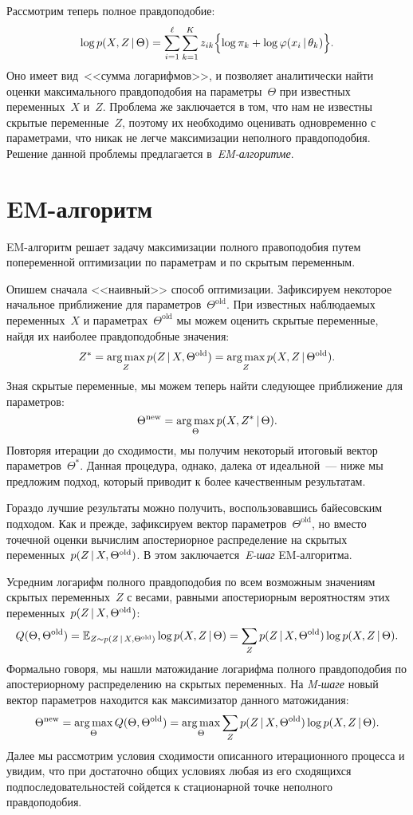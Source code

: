 \documentclass[12pt,fleqn]{article}
\begin{document}
Рассмотрим теперь полное правдоподобие:
\[
    \log p(X, Z \mspace{3mu}{|}\mspace{3mu} \Theta)
    =
    \sum_{i = 1}^{\ell}
    \sum_{k = 1}^{K}
        z_{ik}
        \Bigl\{
            \log \pi_k
            +
            \log \varphi(x_i \mspace{3mu}{|}\mspace{3mu} \theta_k)
        \Bigr\}.
\]
Оно имеет вид~<<сумма логарифмов>>,
и позволяет аналитически найти оценки максимального правдоподобия
на параметры~$\Theta$ при известных переменных~$X$ и~$Z$.
Проблема же заключается в том, что нам не известны скрытые переменные~$Z$,
поэтому их необходимо оценивать одновременно с параметрами,
что никак не легче максимизации неполного правдоподобия.
Решение данной проблемы предлагается в~\emph{EM-алгоритме}.

\section{EM-алгоритм}
EM-алгоритм решает задачу максимизации полного правоподобия
путем попеременной оптимизации по параметрам и по скрытым переменным.

Опишем сначала <<наивный>> способ оптимизации.
Зафиксируем некоторое начальное приближение для параметров~$\Theta^\text{old}$.
При известных наблюдаемых переменных~$X$ и параметрах~$\Theta^\text{old}$
мы можем оценить скрытые переменные, найдя их наиболее правдоподобные значения:
\[
    Z^*
    =
    \mathop{\rm arg\,max}\limits_{Z} p(Z \mspace{3mu}{|}\mspace{3mu} X, \Theta^\text{old})
    =
    \mathop{\rm arg\,max}\limits_{Z} p(X, Z \mspace{3mu}{|}\mspace{3mu} \Theta^\text{old}).
\]
Зная скрытые переменные, мы можем теперь найти следующее приближение для параметров:
\[
    \Theta^\text{new}
    =
    \mathop{\rm arg\,max}\limits_{\Theta} p(X, Z^* \mspace{3mu}{|}\mspace{3mu} \Theta).
\]
Повторяя итерации до сходимости, мы получим некоторый итоговый вектор параметров~$\Theta^*$.
Данная процедура, однако, далека от идеальной~--- ниже мы предложим подход, который
приводит к более качественным результатам.

Гораздо лучшие результаты можно получить, воспользовавшись байесовским подходом.
Как и прежде, зафиксируем вектор параметров~$\Theta^\text{old}$,
но вместо точечной оценки вычислим апостериорное распределение на скрытых
переменных~$p(Z \mspace{3mu}{|}\mspace{3mu} X, \Theta^\text{old})$.
В этом заключается~\emph{E-шаг} EM-алгоритма.

Усредним логарифм полного правдоподобия по всем возможным значениям
скрытых переменных~$Z$ с весами, равными апостериорным вероятностям
этих переменных~$p(Z \mspace{3mu}{|}\mspace{3mu} X, \Theta^\text{old})$:
\[
    Q(\Theta, \Theta^\text{old})
    =
    \mathbb{E}_{Z \sim p(Z \mspace{3mu}{|}\mspace{3mu} X, \Theta^\text{old})}
        \log p(X, Z \mspace{3mu}{|}\mspace{3mu} \Theta)
    =
    \sum_{Z}
        p(Z \mspace{3mu}{|}\mspace{3mu} X, \Theta^\text{old})
        \log p(X, Z \mspace{3mu}{|}\mspace{3mu} \Theta).
\]
Формально говоря, мы нашли матожидание логарифма полного правдоподобия
по апостериорному распределению на скрытых переменных.
На \emph{M-шаге} новый вектор параметров находится как максимизатор данного матожидания:
\[
    \Theta^\text{new}
    =
    \mathop{\rm arg\,max}\limits_{\Theta} Q(\Theta, \Theta^\text{old})
    =
    \mathop{\rm arg\,max}\limits_{\Theta}
    \sum_{Z}
        p(Z \mspace{3mu}{|}\mspace{3mu} X, \Theta^\text{old})
        \log p(X, Z \mspace{3mu}{|}\mspace{3mu} \Theta).
\]
Далее мы рассмотрим условия сходимости описанного итерационного процесса
и увидим, что при достаточно общих условиях любая
из его сходящихся подпоследовательностей сойдется к стационарной точке
неполного правдоподобия.
\end{document}

